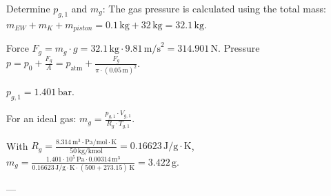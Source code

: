 Determine \( p_{g,1} \) and \( m_g \):  
The gas pressure is calculated using the total mass:  
\( m_{EW} + m_K + m_{piston} = 0.1 \, \text{kg} + 32 \, \text{kg} = 32.1 \, \text{kg} \).  

Force \( F_g = m_g \cdot g = 32.1 \, \text{kg} \cdot 9.81 \, \text{m/s}^2 = 314.901 \, \text{N} \).  
Pressure \( p = p_0 + \frac{F_g}{A} = p_{\text{atm}} + \frac{F_g}{\pi \cdot (0.05 \, \text{m})^2} \).  

\( p_{g,1} = 1.401 \, \text{bar} \).  

For an ideal gas:  
\( m_g = \frac{p_{g,1} \cdot V_{g,1}}{R_g \cdot T_{g,1}} \).  

With \( R_g = \frac{8.314 \, \text{m}^3 \cdot \text{Pa}/\text{mol} \cdot \text{K}}{50 \, \text{kg}/\text{kmol}} = 0.16623 \, \text{J}/\text{g} \cdot \text{K} \),  
\( m_g = \frac{1.401 \cdot 10^5 \, \text{Pa} \cdot 0.00314 \, \text{m}^3}{0.16623 \, \text{J}/\text{g} \cdot \text{K} \cdot (500 + 273.15) \, \text{K}} = 3.422 \, \text{g} \).  

---